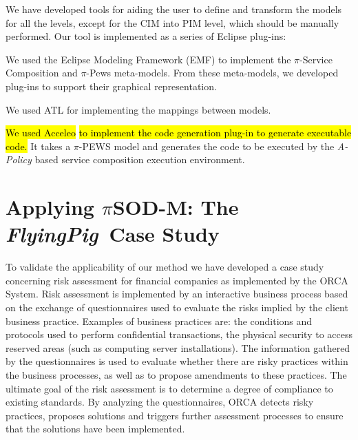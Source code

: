 \documentclass{singlecol-new}
\theoremstyle{TH}{
\newtheorem{lemma}{Lemma}
\newtheorem{theorem}[lemma]{Theorem}
\newtheorem{corrolary}[lemma]{Corrolary}
\newtheorem{conjecture}[lemma]{Conjecture}
\newtheorem{proposition}[lemma]{Proposition}
\newtheorem{claim}[lemma]{Claim}
\newtheorem{stheorem}[lemma]{Wrong Theorem}
\newtheorem{algorithm}{Algorithm}
}
\theoremstyle{THrm}{
\newtheorem{definition}{Definition}[section]
\newtheorem{question}{Question}[section]
\newtheorem{remark}{Remark}
\newtheorem{scheme}{Scheme}
}
\theoremstyle{THhit}{
\newtheorem{case}{Case}[section]
}
\theoremstyle{THhsl}{
\newtheorem{example}{Example}
}
\newcommand{\pisodm}[0]{$\pi$SOD-M\xspace}
\def\FlyingPig{\textsl{FlyingPig}\xspace}
\begin{document}
We have developed tools for aiding the user to define and transform the models for all the levels, except for the CIM into PIM level, which should be manually performed.
Our tool is implemented as a series of Eclipse plug-ins: 
\begin{compactitem}
\item 	We  used the Eclipse Modeling Framework (EMF)\footnotemark {}   to implement the  $\pi$-Service Composition and $\pi$-{\sc Pews}  meta-models. 
From these meta-models, we  developed plug-ins to support their graphical representation.

\item	 We used  ATL\footnotemark {}
for implementing the  mappings between models.

\item 	\hl{We  used Acceleo}\footnotemark {} \hl{to implement  the code generation plug-in to generate executable code.} 
It takes a $\pi$-PEWS model and generates the code to be executed by the {\em
A-Policy} based service composition execution environment.
\end{compactitem}

\section{Applying \pisodm: The \FlyingPig\ Case Study}
\label{sec:flyingPig}


To validate the applicability of our method we have developed a case study concerning risk assessment for financial companies as implemented by the ORCA System\footnotemark {}.%
Risk assessment is implemented by an interactive business process based on the exchange of questionnaires used to evaluate the risks implied by the client business practice.
Examples of business practices are: the conditions and protocols used to perform confidential transactions, the physical security to access reserved areas (such as computing server installations).
The information gathered by the questionnaires is used to evaluate whether there are risky practices within the business processes, as well as to propose amendments to these practices.
The ultimate goal of the risk assessment is to determine a degree of compliance to existing standards.
By analyzing the questionnaires, ORCA detects risky practices, proposes solutions and triggers further assessment processes to ensure that the solutions have been implemented.
\end{document}

